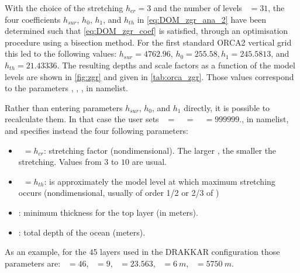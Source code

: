 \documentclass[../main/NEMO_manual]{subfiles}
\begin{document}
With the choice of the stretching $h_{cr} = 3$ and the number of levels ~$= 31$,
the four coefficients $h_{sur}$, $h_0$, $h_1$, and $h_{th}$ in
\autoref{eq:DOM_zgr_ana_2} have been determined such that
\autoref{eq:DOM_zgr_coef} is satisfied, through an optimisation procedure using a bisection method.
For the first standard ORCA2 vertical grid this led to the following values:
$h_{sur} = 4762.96$, $h_0 = 255.58, h_1 = 245.5813$, and $h_{th} = 21.43336$.
The resulting depths and scale factors as a function of the model levels are shown in
\autoref{fig:zgr} and given in \autoref{tab:orca_zgr}.
Those values correspond to the parameters , , ,  in  namelist.

Rather than entering parameters $h_{sur}$, $h_0$, and $h_1$ directly, it is possible to recalculate them.
In that case the user sets ~$=$~~$=$~~$= 999999$.,
in  namelist, and specifies instead the four following parameters:
\begin{itemize}
\item
  ~$= h_{cr}$: stretching factor (nondimensional).
  The larger , the smaller the stretching.
  Values from $3$ to $10$ are usual.
\item
  ~$= h_{th}$: is approximately the model level at which maximum stretching occurs
  (nondimensional, usually of order 1/2 or 2/3 of )
\item
  : minimum thickness for the top layer (in meters).
\item
  : total depth of the ocean (meters).
\end{itemize}
As an example, for the $45$ layers used in the DRAKKAR configuration those parameters are:
~$= 46$, ~$= 9$, ~$= 23.563$, ~$= 6~m$, ~$= 5750~m$.
\end{document}
